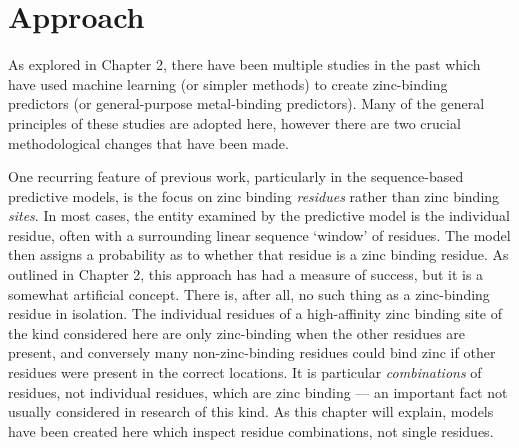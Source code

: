 \section{Approach}

As explored in Chapter 2, there have been multiple studies in the past which have used machine learning (or simpler methods) to create zinc-binding predictors (or general-purpose metal-binding predictors). Many of the general principles of these studies are adopted here, however there are two crucial methodological changes that have been made.

One recurring feature of previous work, particularly in the sequence-based predictive models, is the focus on zinc binding \emph{residues} rather than zinc binding \emph{sites}. In most cases, the entity examined by the predictive model is the individual residue, often with a surrounding linear sequence `window' of residues. The model then assigns a probability as to whether that residue is a zinc binding residue. As outlined in Chapter 2, this approach has had a measure of success, but it is a somewhat artificial concept. There is, after all, no such thing as a zinc-binding residue in isolation. The individual residues of a high-affinity zinc binding site of the kind considered here are only zinc-binding when the other residues are present, and conversely many non-zinc-binding residues could bind zinc if other residues were present in the correct locations. It is particular \emph{combinations} of residues, not individual residues, which are zinc binding --- an important fact not usually considered in research of this kind. As this chapter will explain, models have been created here which inspect residue combinations, not single residues.

